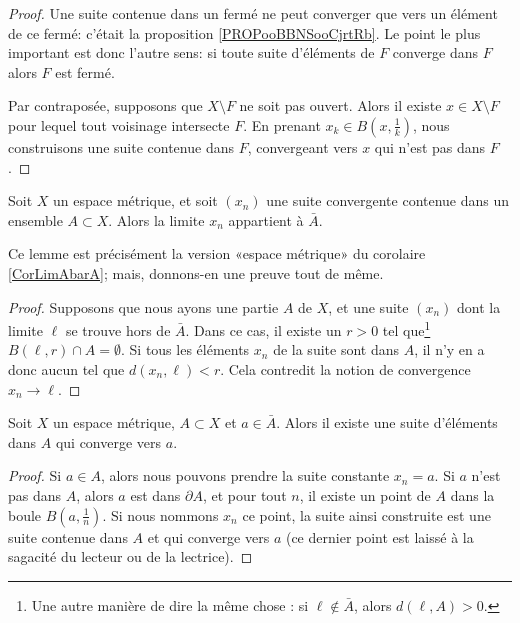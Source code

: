 \begin{proof}
   Une suite contenue dans un fermé ne peut converger que vers un élément de ce fermé: c'était la proposition \ref{PROPooBBNSooCjrtRb}. Le point le plus important est donc l'autre sens: si toute suite d'éléments de \( F \) converge dans \( F \) alors \( F \) est fermé.
    
   Par contraposée, supposons que \( X\setminus F\) ne soit pas ouvert. Alors il existe \( x\in X\setminus F\) pour lequel tout voisinage intersecte \( F\). En prenant \( x_k\in B(x,\frac{1}{ k })\), nous construisons une suite contenue dans \( F\), convergeant vers \( x\) qui n'est pas dans \( F \).
\end{proof}


\begin{lemma}		\label{LemLimAbarA}
  Soit $X$ un espace métrique, et soit $(x_n)$ une suite convergente contenue dans un ensemble $A\subset X$. Alors la limite $x_n$ appartient à $\bar A$.
\end{lemma}
Ce lemme est précisément la version «espace métrique» du corolaire \ref{CorLimAbarA}; mais, donnons-en une preuve tout de même.
\begin{proof}
	Supposons que nous ayons une partie $A$ de $X$, et une suite $(x_n)$ dont la limite $\ell$ se trouve hors de $\bar A$. Dans ce cas, il existe un $r>0$ tel que\footnote{Une autre manière de dire la même chose : si $\ell\notin\bar A$, alors $d(\ell,A)>0$.} $B(\ell,r)\cap A=\emptyset$. Si tous les éléments $x_n$ de la suite sont dans $A$, il n'y en a donc aucun tel que $d(x_n,\ell)<r$. Cela contredit la notion de convergence $x_n\to \ell$.
\end{proof}

\begin{corollary}		\label{CorAdhEstLim}
  Soit $X$ un espace métrique, $A \subset X$ et $a \in \bar A$. Alors il existe une suite d'éléments dans $A$ qui converge vers $a$.
\end{corollary}

\begin{proof}
  Si $a\in A$, alors nous pouvons prendre la suite constante $x_n=a$. Si $a$ n'est pas dans $A$, alors $a$ est dans $\partial A$, et pour tout $n$, il existe un point de $A$ dans la boule $B(a,\frac{1}{ n })$. Si nous nommons $x_n$ ce point, la suite ainsi construite est une suite contenue dans $A$ et qui converge vers $a$ (ce dernier point est laissé à la sagacité du lecteur ou de la lectrice).
\end{proof}

